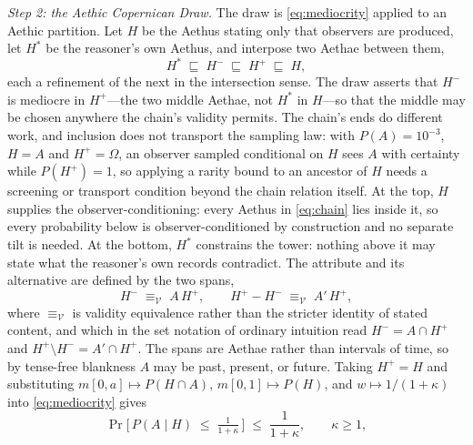 \textit{Step 2: the Aethic Copernican Draw.} The draw is \eqref{eq:mediocrity} applied to an Aethic partition. Let $H$ be the Aethus stating only that observers are produced, let $H^{\ast}$ be the reasoner's own Aethus, and interpose two Aethae between them,
\begin{equation}
\label{eq:chain}
H^{\ast} \;\sqsubseteq\; H^{-} \;\sqsubseteq\; H^{+} \;\sqsubseteq\; H,
\end{equation}
each a refinement of the next in the intersection sense. The draw asserts that $H^{-}$ is mediocre in $H^{+}$---the two middle Aethae, not $H^{\ast}$ in $H$---so that the middle may be chosen anywhere the chain's validity permits. The chain's ends do different work, and inclusion does not transport the sampling law: with $P(A) = 10^{-3}$, $H = A$ and $H^{+} = \Omega$, an observer sampled conditional on $H$ sees $A$ with certainty while $P(H^{+}) = 1$, so applying a rarity bound to an ancestor of $H$ needs a screening or transport condition beyond the chain relation itself. At the top, $H$ supplies the observer-conditioning: every Aethus in \eqref{eq:chain} lies inside it, so every probability below is observer-conditioned by construction and no separate tilt is needed. At the bottom, $H^{\ast}$ constrains the tower: nothing above it may state what the reasoner's own records contradict. The attribute and its alternative are defined by the two spans,
\begin{equation}
\label{eq:attribute-def}
H^{-} \;\equiv_{\mathcal{V}}\; A\,H^{+}, \qquad H^{+} - H^{-} \;\equiv_{\mathcal{V}}\; A'\,H^{+},
\end{equation}
where $\equiv_{\mathcal{V}}$ is validity equivalence rather than the stricter identity of stated content, and which in the set notation of ordinary intuition read $H^{-} = A \cap H^{+}$ and $H^{+} \setminus H^{-} = A' \cap H^{+}$. The spans are Aethae rather than intervals of time, so by tense-free blankness $A$ may be past, present, or future. Taking $H^{+} = H$ and substituting $m[0,a] \mapsto P(H \cap A)$, $m[0,1] \mapsto P(H)$, and $w \mapsto 1/(1+\kappa)$ into \eqref{eq:mediocrity} gives
\begin{equation}
\label{eq:draw}
\Pr\!\big[\, P(A \mid H) \;\le\; \tfrac{1}{1+\kappa} \,\big] \;\le\; \frac{1}{1+\kappa}, \qquad \kappa \ge 1,
\end{equation}

